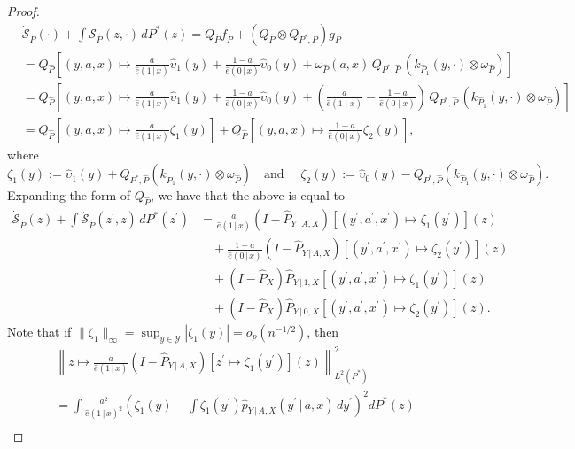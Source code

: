 \documentclass{article}
\theoremstyle{plain}
\theoremstyle{definition}
\theoremstyle{remark}
\newcommand{\of}[1]{\left(#1\right)}
\newcommand{\off}[1]{\left[#1\right]}
\newcommand{\cY}{\mathcal{Y}}
\newcommand{\wh}[1]{\widehat{#1}}
\newcommand{\hP}{\widehat{P}}
\newcommand{\1}{\mathbbm{1}}
\newcommand{\STE}{\mathscr{S}}
\newcommand{\norm}[1]{\left \| #1 \right \|}
\theoremstyle{plain}
\theoremstyle{definition}
\newcommand{\mymid}{\,|\,}
\newcommand{\tand}{\textrm{and }}
\begin{document}
\begin{proof}
    \begin{align*}
    &\dot{\STE}_{\hP}(\cdot) + \int \ddot{\STE}_{\hP}(z, \cdot) \, dP^*(z)= Q_{\hP} f_{\hP} + (Q_{\hP} \otimes Q_{P^*, \hP}) g_{\hP}\\
       &= Q_{\hP} \off{(y,a,x) \mapsto \frac{a}{\hat{e}(1 \mymid x)} \wh{\upsilon}_1(y) + \frac{1-a}{\hat{e}(0 \mymid x)}  \wh{\upsilon}_0(y) +  \omega_{\hP}(a, x) \,Q_{P^*, \hP} \, \of{k_{\hP_1} (y, \cdot) \otimes \omega_{\hP}}}\\
       &= Q_{\hP} \off{(y,a,x) \mapsto  \frac{a}{\hat{e}(1 \mymid x)} \wh{\upsilon}_1(y) + \frac{1-a}{\hat{e}(0 \mymid x)}  \wh{\upsilon}_0(y) + \of{\frac{a}{\hat{e}(1 \mid x)} - \frac{1-a}{\hat{e}(0 \mid x)}} \,Q_{P^*, \hP} \, \of{k_{\hP_1} (y, \cdot) \otimes \omega_{\hP}}}\\
        &= Q_{\hP} \off{(y,a,x) \mapsto \frac{a}{\hat{e}(1 \mymid x)}\zeta_1(y)}+ Q_{\hP} \off{(y,a,x) \mapsto \frac{1-a}{\hat{e}(0 \mymid x)} \zeta_2(y) },
    \end{align*}
    where
    \[
    \zeta_1(y) :=  \wh{\upsilon}_1(y) + Q_{P^*, \hP} \of{k_{\hP_1} (y, \cdot) \otimes \omega_{\hP}}\quad \tand \quad \zeta_2(y) :=  \wh{\upsilon}_0(y) - Q_{P^*, \hP} \of{k_{\hP_1} (y, \cdot) \otimes \omega_{\hP}}.
    \]
    Expanding the form of $Q_{\hP}$, we have that the above is equal to
    \begin{align*}
        \dot{\STE}_{\hP}(z) + \int \ddot{\STE}_{\hP}(z^\prime, z) \, dP^*(z^\prime) &= \frac{a}{\hat{e}(1 \mymid x)}(I - \hP_{Y \mymid A,X})\off{(y^\prime, a^\prime, x^\prime) \mapsto \zeta_1(y^\prime)}(z) \\
        & \quad+ \frac{1-a}{\hat{e}(0 \mymid x)}(I - \hP_{Y \mymid A,X})\off{(y^\prime, a^\prime, x^\prime) \mapsto \zeta_2(y^\prime)}(z)\\
        &\quad + (I - \hP_X) \hP_{Y \mymid 1, X} \off{ (y^\prime, a^\prime, x^\prime) \mapsto \zeta_1(y^\prime)}(z)\\
        & \quad + (I - \hP_X) \hP_{Y \mymid 0, X} \off{(y^\prime, a^\prime, x^\prime) \mapsto \zeta_2(y^\prime)}(z).
    \end{align*}
    Note that if $\|\zeta_1\|_\infty = \sup_{y \in \cY} |\zeta_1(y)| = o_p(n^{-1/2})$, then
    \begin{align*}
        &\norm{z \mapsto \frac{a}{\hat{e}(1 \mymid x)}(I - \hP_{Y \mymid A,X})\off{z^\prime \mapsto \zeta_1(y^\prime)}(z)}_{L^2(P^*)}^2\\
        &= \int \frac{a^2}{\hat{e}(1 \mymid x)^2} \of{\zeta_1(y) - \int \zeta_1(y^\prime) \hat{p}_{Y \mymid A, X}(y^\prime \mymid a, x)\, dy^\prime}^2 dP^*(z)\\

\end{align*}
\end{proof}
\end{document}
